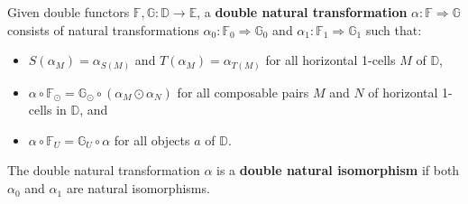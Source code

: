 \documentclass[ a4paper, onecolumn, superscriptaddress,10pt, accepted=2022-02-14, issue=3, volume=4, shorttitle=papers/compositionality-4-3 ]{compositionalityarticle}
\let\maps\colon
\newcommand{\double}[1]{\mathbf{\mathbb #1}}
\newcommand{\lD}{\double{D}}
\newcommand{\lE}{\double{E}}
\newcommand{\lF}{\double{F}}
\newcommand{\define}[1]{{\rm \textbf{#1}}}
\begin{document}
\begin{defn}
Given double functors $\lF,\mathbb{G} \maps \lD \to \lE$, a \define{double natural transformation} $\alpha \maps \lF \Rightarrow \mathbb{G}$ consists of natural transformations $\alpha_0 \maps \lF_0 \Rightarrow \mathbb{G}_0$ and $\alpha_1 \maps \lF_1 \Rightarrow \mathbb{G}_1$ such that:
\begin{itemize}
\item{$S(\alpha_M) = \alpha_{S(M)}$ and $T(\alpha_M) = \alpha_{T(M)}$ for all horizontal 1-cells $M$ of $\lD$,}
\item{$\alpha \circ \lF_\odot = \mathbb{G}_\odot \circ (\alpha_M \odot \alpha_N)$ for all composable pairs $M$ and $N$ of horizontal 1-cells in $\lD$, and}
\item{$\alpha \circ \lF_U = \mathbb{G}_U \circ \alpha$ for all objects $a$ of $\lD$.}
\end{itemize}
The double natural transformation $\alpha$ is a \define{double natural isomorphism} if both $\alpha_0$ and $\alpha_1$ are natural isomorphisms.
\end{defn}
\end{document}
